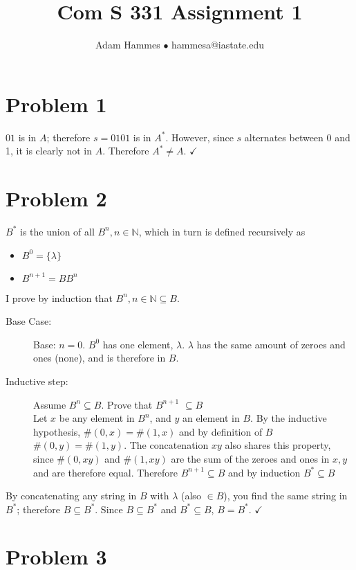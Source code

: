 \documentclass[11pt]{article}
\begin{document}
\title{Com S 331 Assignment 1}
\author{Adam Hammes $\bullet$ hammesa@iastate.edu}
\maketitle

\section*{Problem 1}

$01$ is in $A$; therefore $s = 0101$ is in $A^*$. However, since $s$ alternates between 0 and 1, it is clearly not in $A$. Therefore $A^* \neq A$. $\checkmark$

\section*{Problem 2}
$B^*$ is  the union of all $B^n, n \in \mathbb{N}$, which in turn is defined recursively as
	\begin{itemize}
		\item 		$B^0	= \{\lambda\}$
		\item		$B^{n+1}	 = BB^n$
	\end{itemize}
I prove by induction that $B^n, n \in \mathbb{N} \subseteq B$.

\begin{description}
	\item[Base Case:] Base: $n = 0$. $B^0$ has one element, $\lambda$. $\lambda$ has the same amount of zeroes and ones (none), and is therefore in $B$.
	
	\item[Inductive step:] Assume $B^n \subseteq B$. Prove that $B^{n+1}$ $\subseteq B$\\
	Let $x$ be any element in $B^n$, and $y$ an element in $B$. By the inductive hypothesis, $\#(0,x) =\#(1,x)$ and by definition of $B$ $\#(0,y) = \#(1,y)$. The concatenation $xy$ also shares this property, since $\#(0,xy)$ and $\#(1, xy)$ are the sum of the zeroes and ones in $x,y$ and are therefore equal. Therefore $B^{n+1} \subseteq B$ and by induction $B^* \subseteq B$
\end{description}
By concatenating any string in $B$ with $\lambda$ (also $\in B$), you find the same string in $B^*$; therefore $B \subseteq B^*$. Since $B \subseteq B^*$ and $B^* \subseteq B$, $B = B^*$. $\checkmark$

\section*{Problem 3}
\end{document}
